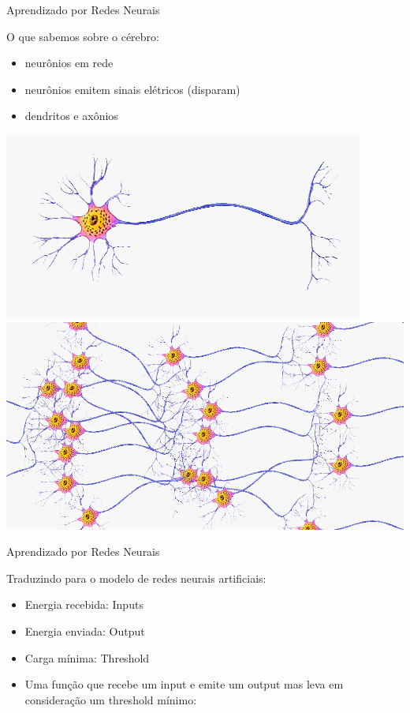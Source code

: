 \documentclass[10pt]{beamer}
\begin{document}
\begin{frame}{Aprendizado por Redes Neurais}

O que sabemos sobre o cérebro:
\vspace{0.2cm}
\begin{itemize}
\item neurônios em rede
\vspace{0.2cm}
\item  neurônios emitem sinais elétricos (disparam)
\vspace{0.2cm}
\item dendritos e axônios


\end{itemize}

\includegraphics[width=.50\textwidth]{images/neuron.png}
\includegraphics[width=.50\textwidth]{images/neuronsnetwork.png}

\end{frame}



\begin{frame}{Aprendizado por Redes Neurais}

Traduzindo para o modelo de redes neurais artificiais:
\vspace{0.2cm}
\begin{itemize}
\item Energia recebida: \alert{Inputs}
\vspace{0.2cm}
\item  Energia enviada: \alert{Output}
\vspace{0.2cm}
\item Carga mínima: \alert{Threshold}
\vspace{0.2cm}
\item Uma função que recebe um input e emite um output mas leva em consideração um threshold mínimo: 

\end{itemize}

\end{frame}
\end{document}

